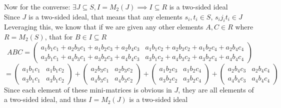 \documentclass[11pt]{article}
\begin{document}
{    Now for the converse: $\exists J \subseteq S, I = M_2(J) \implies I \subseteq R$ is a two-sided ideal \\
    Since $J$ is a two-sided ideal, that means that any elements $s_i, t_i \in S$, $s_ij_it_i \in J$ \\
    Leveraging this, we know that if we are given any other elements $A, C \in R$ where $R = M_2(S)$, that for $B \in I \subseteq R$
    $$ABC = \begin{pmatrix}
            a_1b_1c_1 + a_2b_3c_1 + a_1b_2c_3 + a_2b_4c_3 & a_1b_1c_2 + a_2b_3c_2 + a_1b_2c_4 + a_2b_4c_4 \\
            a_3b_1c_1 + a_4b_3c_1 + a_3b_2c_3 + a_4b_4c_3 & a_3b_1c_2 + a_4b_3c_2 + a_3b_2c_4 + a_4b_4c_4\end{pmatrix}$$
    $$= \begin{pmatrix}
            a_1b_1c_1 & a_1b_1c_2 \\
            a_3b_1c_1 & a_3b_1c_2
        \end{pmatrix} + \begin{pmatrix}
            a_2b_3c_1 & a_2b_3c_2 \\
            a_4b_3c_1 & a_4b_3c_2
        \end{pmatrix} + \begin{pmatrix}
            a_1b_2c_3 & a_1b_2c_4 \\
            a_3b_2c_2 & a_3b_2c_4
        \end{pmatrix} + \begin{pmatrix}
            a_2b_4c_3 & a_2b_4c_4 \\
            a_4b_4c_3 & a_4b_4c_4
        \end{pmatrix}$$
    Since each element of these mini-matrices is obvious in $J$, they are all elements of a two-sided ideal, and thus $I = M_2(J)$ is a two-sided ideal
}
\end{document}
